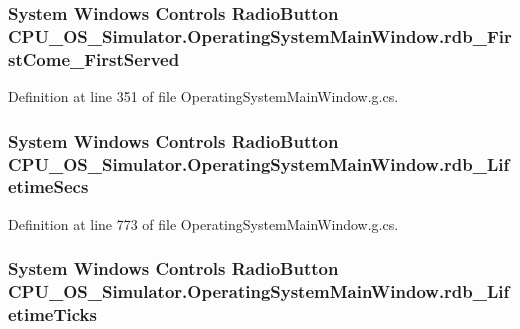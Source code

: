 \subsubsection[{rdb\+\_\+\+First\+Come\+\_\+\+First\+Served}]{\setlength{\rightskip}{0pt plus 5cm}System Windows Controls Radio\+Button C\+P\+U\+\_\+\+O\+S\+\_\+\+Simulator.\+Operating\+System\+Main\+Window.\+rdb\+\_\+\+First\+Come\+\_\+\+First\+Served\hspace{0.3cm}{\ttfamily [package]}}\label{class_c_p_u___o_s___simulator_1_1_operating_system_main_window_a929f7f488fb80ae6459510ad3334fddb}


Definition at line 351 of file Operating\+System\+Main\+Window.\+g.\+cs.

\hypertarget{class_c_p_u___o_s___simulator_1_1_operating_system_main_window_a09745c9a76909a398d8a47295fda2b67}{}
\subsubsection[{rdb\+\_\+\+Lifetime\+Secs}]{\setlength{\rightskip}{0pt plus 5cm}System Windows Controls Radio\+Button C\+P\+U\+\_\+\+O\+S\+\_\+\+Simulator.\+Operating\+System\+Main\+Window.\+rdb\+\_\+\+Lifetime\+Secs\hspace{0.3cm}{\ttfamily [package]}}\label{class_c_p_u___o_s___simulator_1_1_operating_system_main_window_a09745c9a76909a398d8a47295fda2b67}


Definition at line 773 of file Operating\+System\+Main\+Window.\+g.\+cs.

\hypertarget{class_c_p_u___o_s___simulator_1_1_operating_system_main_window_ae338ba4b15d62c6d584aaa5814fa8506}{}
\subsubsection[{rdb\+\_\+\+Lifetime\+Ticks}]{\setlength{\rightskip}{0pt plus 5cm}System Windows Controls Radio\+Button C\+P\+U\+\_\+\+O\+S\+\_\+\+Simulator.\+Operating\+System\+Main\+Window.\+rdb\+\_\+\+Lifetime\+Ticks\hspace{0.3cm}{\ttfamily [package]}}\label{class_c_p_u___o_s___simulator_1_1_operating_system_main_window_ae338ba4b15d62c6d584aaa5814fa8506}


